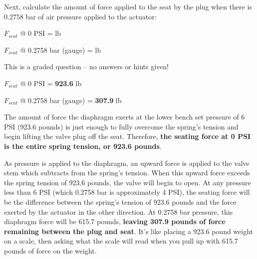 Next, calculate the amount of force applied to the seat by the plug when there is 0.2758 bar of air pressure applied to the actuator:

\vskip 10pt

$F_{seat}$ @ 0 PSI = \underbar{\hskip 50pt} lb

\vskip 20pt

$F_{seat}$ @ 0.2758 bar (gauge) = \underbar{\hskip 50pt} lb

\vfil

\eject






This is a graded question -- no answers or hints given!







$F_{seat}$ @ 0 PSI = {\bf 923.6} lb

\vskip 10pt

$F_{seat}$ @ 0.2758 bar (gauge) = {\bf 307.9} lb

\vskip 10pt

The amount of force the diaphragm exerts at the lower bench set pressure of 6 PSI (923.6 pounds) is just enough to fully overcome the spring's tension and begin lifting the valve plug off the seat.  Therefore, {\bf the seating force at 0 PSI is the entire spring tension, or 923.6 pounds}.

\vskip 10pt

As pressure is applied to the diaphragm, an upward force is applied to the valve stem which subtracts from the spring's tension.  When this upward force exceeds the spring tension of 923.6 pounds, the valve will begin to open.  At any pressure less than 6 PSI (which 0.2758 bar is approximately 4 PSI), the seating force will be the difference between the spring's tension of 923.6 pounds and the force exerted by the actuator in the other direction.  At 0.2758 bar pressure, this diaphragm force will be 615.7 pounds, {\bf leaving 307.9 pounds of force remaining between the plug and seat}.  It's like placing a 923.6 pound weight on a scale, then asking what the scale will read when you pull up with 615.7 pounds of force on the weight.





